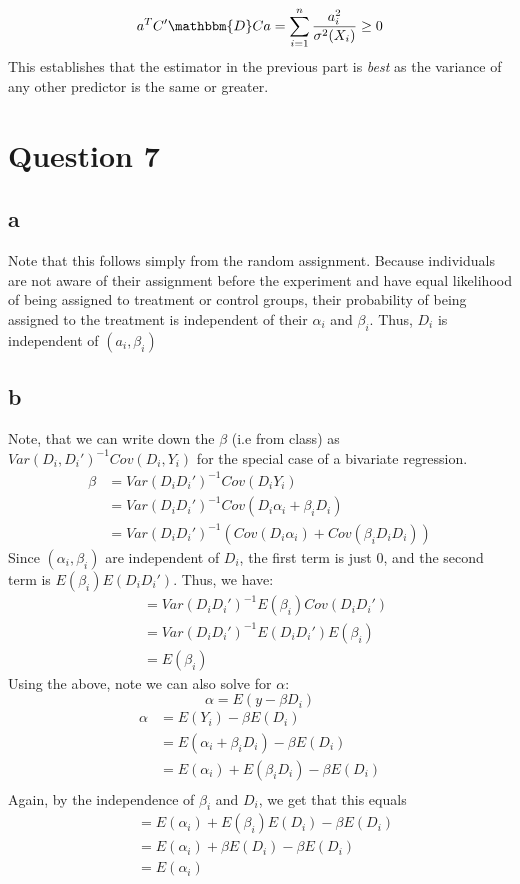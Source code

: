 \documentclass{article}
\begin{document}
$$a^T C' \mathbbm{D} C a = \sum_{i=1}^n \frac{a_i^2}{\sigma^2(X_i)} \geq 0$$
This establishes that the estimator in the previous part is \textit{best} as the variance of any other predictor is the same or greater.


\section*{Question 7}
\subsection*{a}
Note that this follows simply from the random assignment. Because individuals are not aware of their assignment before the experiment and have equal likelihood of being assigned to treatment or control groups, their probability of being assigned to the treatment is independent of their $\alpha_i$ and $\beta_i$. Thus, $D_i$ is independent of $(a_i,\beta_i)$
\subsection*{b}
Note, that we can write down the $\beta$ (i.e from class) as $Var(D_i,D_i')^{-1}Cov(D_i,Y_i)$ for the special case of a bivariate regression. 
\begin{align*}
    \beta &= Var(D_iD_i')^{-1}Cov(D_iY_i) \\
    &= Var(D_iD_i')^{-1}Cov(D_i\alpha_i + \beta_i D_i) \\
    &= Var(D_iD_i')^{-1}(Cov(D_i\alpha_i) + Cov(\beta_i D_iD_i)) 
\end{align*}
Since $(\alpha_i,\beta_i)$ are independent of $D_i$, the first term is just 0, and the second term is $E(\beta_i)E(D_iD_i')$. Thus, we have:
\begin{align*}
    & = Var(D_iD_i')^{-1} E(\beta_i)Cov(D_iD_i') \\
    & = Var(D_iD_i')^{-1} E(D_iD_i')E(\beta_i)\\
    & = E(\beta_i)
\end{align*}
Using the above, note we can also solve for $\alpha$:
$$ \alpha = E(y-\beta D_i)$$
\begin{align*}
    \alpha & = E(Y_i) - \beta E(D_i) \\
    & = E(\alpha_i + \beta_i D_i) - \beta E(D_i) \\
    & = E(\alpha_i) + E(\beta_i D_i) - \beta E(D_i) \\
\end{align*}
Again, by the independence of $\beta_i$ and $D_i$, we get that this equals
\begin{align*}
    & = E(\alpha_i) + E(\beta_i) E(D_i) - \beta E(D_i) \\
    & = E(\alpha_i) + \beta E( D_i) - \beta E(D_i) \\
    & = E(\alpha_i)  \\
\end{align*}
\end{document}
